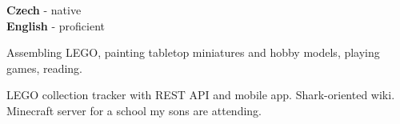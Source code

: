 \documentclass[9pt]{developercv} %
\begin{document}

\begin{minipage}[t]{0.3\textwidth} %
	\vspace{-\baselineskip} %

	
	\textbf{Czech} - native\\
	\textbf{English} - proficient
\end{minipage}
\hfill %
\begin{minipage}[t]{0.3\textwidth} %
	\vspace{-\baselineskip} %
	
	
	Assembling LEGO, painting tabletop miniatures and hobby models, playing games, reading.
\end{minipage}
\hfill %
\begin{minipage}[t]{0.3\textwidth} %
	\vspace{-\baselineskip} %
	
	
	LEGO collection tracker with REST API and mobile app. Shark-oriented wiki.
	Minecraft server for a school my sons are attending.
\end{minipage}

\end{document}
